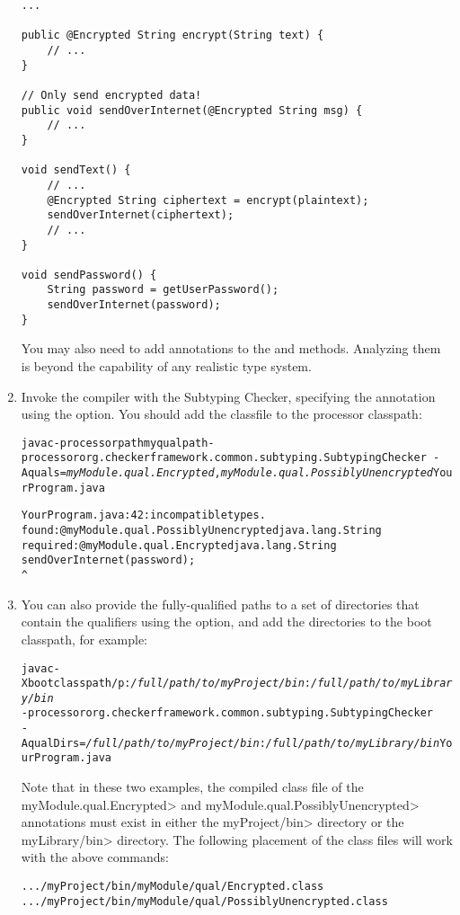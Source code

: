 \begin{enumerate}
\begin{Verbatim}
...

public @Encrypted String encrypt(String text) {
    // ...
}

// Only send encrypted data!
public void sendOverInternet(@Encrypted String msg) {
    // ...
}

void sendText() {
    // ...
    @Encrypted String ciphertext = encrypt(plaintext);
    sendOverInternet(ciphertext);
    // ...
}

void sendPassword() {
    String password = getUserPassword();
    sendOverInternet(password);
}
\end{Verbatim}

You may also need to add  annotations to the
 and  methods.  Analyzing them is beyond the
capability of any realistic type system.

\item
  Invoke the compiler with the Subtyping Checker, specifying the
   annotation using the  option.
  You should add the  classfile to the processor classpath:

\begin{alltt}
  javac -processorpath myqualpath -processor org.checkerframework.common.subtyping.SubtypingChecker \
        -Aquals=\textit{myModule.qual.Encrypted},\textit{myModule.qual.PossiblyUnencrypted} YourProgram.java

YourProgram.java:42: incompatible types.
found   : @myModule.qual.PossiblyUnencrypted java.lang.String
required: @myModule.qual.Encrypted java.lang.String
    sendOverInternet(password);
                     ^
\end{alltt}

\item
You can also provide the fully-qualified paths to a set of directories
that contain the qualifiers using the \code{-AqualDirs} option, and add
the directories to the boot classpath, for example:

\begin{alltt}
  javac -Xbootclasspath/p:\textit{/full/path/to/myProject/bin}:\textit{/full/path/to/myLibrary/bin} \ttbs
        -processor org.checkerframework.common.subtyping.SubtypingChecker \ttbs
        -AqualDirs=\textit{/full/path/to/myProject/bin}:\textit{/full/path/to/myLibrary/bin} YourProgram.java
\end{alltt}

Note that in these two examples, the compiled class file of the
\<myModule.qual.Encrypted> and \<myModule.qual.PossiblyUnencrypted> annotations
must exist in either the \<myProject/bin> directory or the \<myLibrary/bin>
directory. The following placement of the class files will work with the above
commands:

\begin{alltt}
  .../myProject/bin/myModule/qual/Encrypted.class
  .../myProject/bin/myModule/qual/PossiblyUnencrypted.class
\end{alltt}

\end{enumerate}

